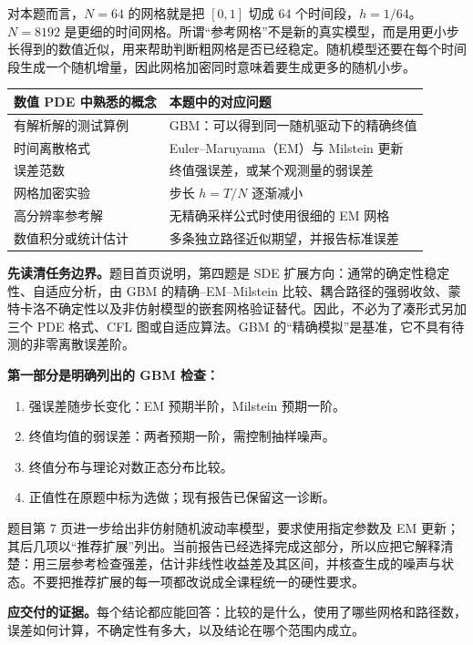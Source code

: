 \documentclass[11pt,a4paper,fontset=none]{ctexart}
\begin{document}
对本题而言，$N=64$ 的网格就是把 $[0,1]$ 切成 64 个时间段，$h=1/64$。$N=8192$ 是更细的时间网格。所谓“参考网格”不是新的真实模型，而是用更小步长得到的数值近似，用来帮助判断粗网格是否已经稳定。随机模型还要在每个时间段生成一个随机增量，因此网格加密同时意味着要生成更多的随机小步。

\begin{table}[H]\centering\small
\begin{tabularx}{\textwidth}{@{}XX@{}}\toprule
数值 PDE 中熟悉的概念 & 本题中的对应问题\\\midrule
有解析解的测试算例 & GBM：可以得到同一随机驱动下的精确终值\\
时间离散格式 & Euler--Maruyama（EM）与 Milstein 更新\\
误差范数 & 终值强误差，或某个观测量的弱误差\\
网格加密实验 & 步长 $h=T/N$ 逐渐减小\\
高分辨率参考解 & 无精确采样公式时使用很细的 EM 网格\\
数值积分或统计估计 & 多条独立路径近似期望，并报告标准误差\\\bottomrule
\end{tabularx}
\end{table}

\textbf{先读清任务边界。}题目首页说明，第四题是 SDE 扩展方向：通常的确定性稳定性、自适应分析，由 GBM 的精确--EM--Milstein 比较、耦合路径的强弱收敛、蒙特卡洛不确定性以及非仿射模型的嵌套网格验证替代。因此，不必为了凑形式另加三个 PDE 格式、CFL 图或自适应算法。GBM 的“精确模拟”是基准，它不具有待测的非零离散误差阶。

\textbf{第一部分是明确列出的 GBM 检查：}
\begin{enumerate}
\item 强误差随步长变化：EM 预期半阶，Milstein 预期一阶。
\item 终值均值的弱误差：两者预期一阶，需控制抽样噪声。
\item 终值分布与理论对数正态分布比较。
\item 正值性在原题中标为选做；现有报告已保留这一诊断。
\end{enumerate}
题目第 7 页进一步给出非仿射随机波动率模型，要求使用指定参数及 EM 更新；其后几项以“推荐扩展”列出。当前报告已经选择完成这部分，所以应把它解释清楚：用三层参考检查强差，估计非线性收益差及其区间，并核查生成的噪声与状态。不要把推荐扩展的每一项都改说成全课程统一的硬性要求。

\textbf{应交付的证据。}每个结论都应能回答：比较的是什么，使用了哪些网格和路径数，误差如何计算，不确定性有多大，以及结论在哪个范围内成立。
\end{document}
